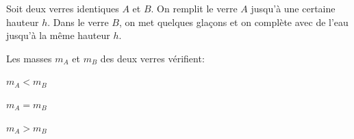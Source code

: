 
\hauteurLargeurCadreReponse		{8mm}{1.5cm}
\initialisationEntrainement



\debutEntrainement

\begin{enonce}
Soit deux verres identiques $A$ et $B$. On remplit le verre $A$
jusqu'à une certaine hauteur $h$. Dans le verre $B$, on met quelques
glaçons et on complète avec de l'eau jusqu'à la même hauteur $h$. 

Les masses $m_{A}$ et $m_{B}$ des deux verres vérifient:
	\begin{listeQCM3Colonnes}
	\item $m_{A}<m_{B}$
	\item $m_{A}=m_{B}$
	\item $m_{A}>m_{B}$
	\end{listeQCM3Colonnes}
\end{enonce}

